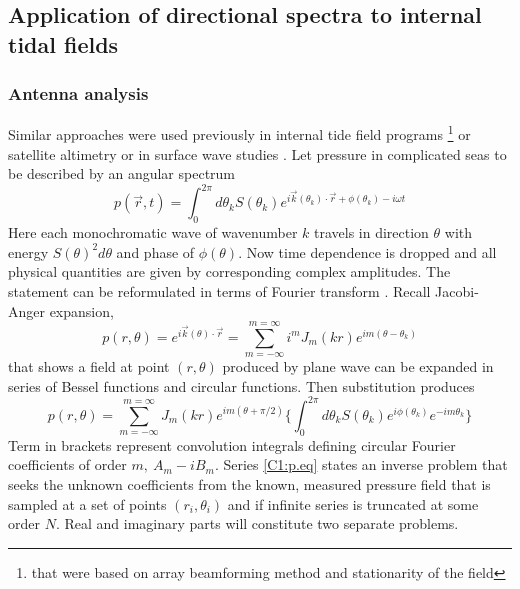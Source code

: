 \documentclass[12pt]{article}
\begin{document}
\subsection{Application of directional spectra to internal tidal fields}
\subsubsection{Antenna analysis}
\label{C3.app:A1}
Similar approaches were used previously in internal tide field programs 
\citep{hendry1977observations, lozovatsky2003spatial} \footnote{that were based on array 
beamforming method and stationarity of the field} or satellite altimetry \citep{dushaw2002mapping} 
or in surface wave studies \citep{longuet1961observations, munk1963directional, long1986inverse}. 
Let pressure in complicated seas to be described by an angular spectrum
\begin{equation}
\label{C1:eq.spectrum}
p(\vec{r}, t) = \int_0^{2\pi}  d\theta_k S(\theta_k) e^{i \vec{k}(\theta_k) \cdot \vec{r} + 
	\phi(\theta_k) - i \omega t}
\end{equation}
Here each monochromatic wave of wavenumber $k$ travels in direction $\theta$ with 
energy $S(\theta)^2 d\theta$ and phase of $\phi(\theta)$. Now time dependence is dropped and all 
physical quantities are given by corresponding complex amplitudes. The statement can be 
reformulated in terms of Fourier transform \citep{munk1963directional}. Recall Jacobi-Anger 
expansion,
\begin{equation}
p(r, \theta) = e^{i \vec{k}(\theta) \cdot \vec{r}} = \sum_{m = -\infty}^{m = \infty} i^{m} J_{m}(k 
r) e^{im(\theta - \theta_k)}
\end{equation}
that shows a field at point $(r, \theta)$ produced by plane wave can be expanded in series of 
Bessel functions and circular functions. Then substitution produces
\begin{equation}
\label{C1:p.eq}
p(r, \theta) = \sum_{m=-\infty}^{m=\infty} J_m(kr) e^{im(\theta + \pi/2)} \Big\{ \int_0^{2\pi}  
d\theta_k 
S(\theta_k) 
e^{i\phi(\theta_k)} e^{-im\theta_k} \Big\}
\end{equation}
Term in brackets represent convolution integrals defining circular Fourier coefficients of 
order $m,~A_m - i B_m$. Series \eqref{C1:p.eq} states an inverse problem that seeks the 
unknown coefficients from the known, measured pressure field that is sampled at a set of points 
$(r_i, \theta_i)$ and if infinite series is truncated at some order $N$. Real and imaginary parts 
will constitute two separate problems.\\
\end{document}
